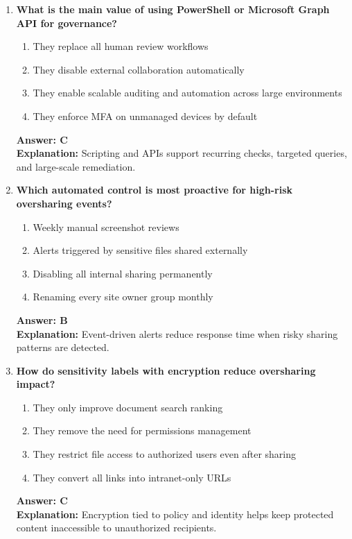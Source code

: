 \documentclass[10pt]{article}
\begin{document}
\begin{enumerate}[leftmargin=*]
\item \textbf{What is the main value of using PowerShell or Microsoft Graph API for governance?}
\begin{enumerate}[label=\Alph*.]
  \item They replace all human review workflows
  \item They disable external collaboration automatically
  \item They enable scalable auditing and automation across large environments
  \item They enforce MFA on unmanaged devices by default
\end{enumerate}
\textbf{Answer: C}\\
\textbf{Explanation:} Scripting and APIs support recurring checks, targeted queries, and large-scale remediation.

\item \textbf{Which automated control is most proactive for high-risk oversharing events?}
\begin{enumerate}[label=\Alph*.]
  \item Weekly manual screenshot reviews
  \item Alerts triggered by sensitive files shared externally
  \item Disabling all internal sharing permanently
  \item Renaming every site owner group monthly
\end{enumerate}
\textbf{Answer: B}\\
\textbf{Explanation:} Event-driven alerts reduce response time when risky sharing patterns are detected.

\item \textbf{How do sensitivity labels with encryption reduce oversharing impact?}
\begin{enumerate}[label=\Alph*.]
  \item They only improve document search ranking
  \item They remove the need for permissions management
  \item They restrict file access to authorized users even after sharing
  \item They convert all links into intranet-only URLs
\end{enumerate}
\textbf{Answer: C}\\
\textbf{Explanation:} Encryption tied to policy and identity helps keep protected content inaccessible to unauthorized recipients.


\end{enumerate}
\end{document}
